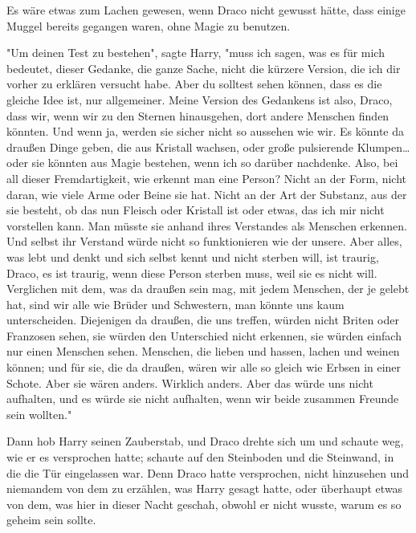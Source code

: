 {Es wäre etwas zum Lachen gewesen, wenn Draco nicht gewusst hätte, dass einige Muggel bereits gegangen waren, ohne Magie zu benutzen.

"Um deinen Test zu bestehen", sagte Harry, "muss ich sagen, was es für mich bedeutet, dieser Gedanke, die ganze Sache, nicht die kürzere Version, die ich dir vorher zu erklären versucht habe. Aber du solltest sehen können, dass es die gleiche Idee ist, nur allgemeiner. Meine Version des Gedankens ist also, Draco, dass wir, wenn wir zu den Sternen hinausgehen, dort andere Menschen finden könnten. Und wenn ja, werden sie sicher nicht so aussehen wie wir. Es könnte da draußen Dinge geben, die aus Kristall wachsen, oder große pulsierende Klumpen… oder sie könnten aus Magie bestehen, wenn ich so darüber nachdenke. Also, bei all dieser Fremdartigkeit, wie erkennt man eine Person? Nicht an der Form, nicht daran, wie viele Arme oder Beine sie hat. Nicht an der Art der Substanz, aus der sie besteht, ob das nun Fleisch oder Kristall ist oder etwas, das ich mir nicht vorstellen kann. Man müsste sie anhand ihres Verstandes als Menschen erkennen. Und selbst ihr Verstand würde nicht so funktionieren wie der unsere. Aber alles, was lebt und denkt und sich selbst kennt und nicht sterben will, ist traurig, Draco, es ist traurig, wenn diese Person sterben muss, weil sie es nicht will. Verglichen mit dem, was da draußen sein mag, mit jedem Menschen, der je gelebt hat, sind wir alle wie Brüder und Schwestern, man könnte uns kaum unterscheiden. Diejenigen da draußen, die uns treffen, würden nicht Briten oder Franzosen sehen, sie würden den Unterschied nicht erkennen, sie würden einfach nur einen Menschen sehen. Menschen, die lieben und hassen, lachen und weinen können; und für sie, die da draußen, wären wir alle so gleich wie Erbsen in einer Schote. Aber sie wären anders. Wirklich anders. Aber das würde uns nicht aufhalten, und es würde sie nicht aufhalten, wenn wir beide zusammen Freunde sein wollten."

Dann hob Harry seinen Zauberstab, und Draco drehte sich um und schaute weg, wie er es versprochen hatte; schaute auf den Steinboden und die Steinwand, in die die Tür eingelassen war. Denn Draco hatte versprochen, nicht hinzusehen und niemandem von dem zu erzählen, was Harry gesagt hatte, oder überhaupt etwas von dem, was hier in dieser Nacht geschah, obwohl er nicht wusste, warum es so geheim sein sollte.

}
